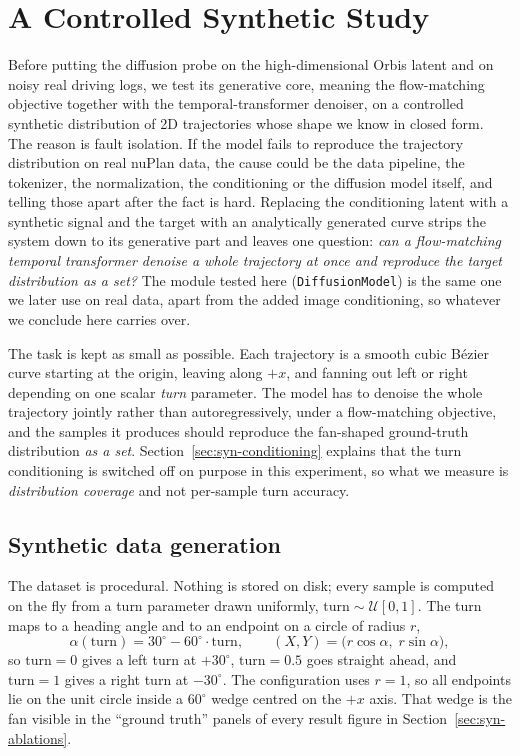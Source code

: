 \section{A Controlled Synthetic Study}
\label{sec:synthetic}

Before putting the diffusion probe on the high-dimensional Orbis latent and on
noisy real driving logs, we test its generative core, meaning the flow-matching
objective together with the temporal-transformer denoiser, on a controlled
synthetic distribution of 2D trajectories whose shape we know in closed form.
The reason is fault isolation. If the model fails to reproduce the trajectory
distribution on real nuPlan data, the cause could be the data pipeline, the
tokenizer, the normalization, the conditioning or the diffusion model itself,
and telling those apart after the fact is hard. Replacing the conditioning
latent with a synthetic signal and the target with an analytically generated
curve strips the system down to its generative part and leaves one question:
\emph{can a flow-matching temporal transformer denoise a whole trajectory at
once and reproduce the target distribution as a set?} The module tested here
(\texttt{DiffusionModel}) is the same one we later use on real data, apart from
the added image conditioning, so whatever we conclude here carries over.

The task is kept as small as possible. Each trajectory is a smooth cubic
B\'ezier curve starting at the origin, leaving along $+x$, and fanning out left
or right depending on one scalar \emph{turn} parameter. The model has to denoise
the whole trajectory jointly rather than autoregressively, under a flow-matching
objective, and the samples it produces should reproduce the fan-shaped
ground-truth distribution \emph{as a set}. Section~\ref{sec:syn-conditioning}
explains that the turn conditioning is switched off on purpose in this
experiment, so what we measure is \emph{distribution coverage} and not
per-sample turn accuracy.

\subsection{Synthetic data generation}
\label{sec:syn-data}

The dataset is procedural. Nothing is stored on disk; every sample is computed
on the fly from a turn parameter drawn uniformly,
$\text{turn}\sim\mathcal{U}[0,1]$. The turn maps to a heading angle and to an
endpoint on a circle of radius $r$,
\begin{equation}
\alpha(\text{turn}) = 30^\circ - 60^\circ\cdot\text{turn},
\qquad
(X, Y) = \big(r\cos\alpha,\; r\sin\alpha\big),
\label{eq:syn-endpoint}
\end{equation}
so $\text{turn}=0$ gives a left turn at $+30^\circ$, $\text{turn}=0.5$ goes
straight ahead, and $\text{turn}=1$ gives a right turn at $-30^\circ$. The
configuration uses $r=1$, so all endpoints lie on the unit circle inside a
$60^\circ$ wedge centred on the $+x$ axis. That wedge is the fan visible in the
``ground truth'' panels of every result figure in
Section~\ref{sec:syn-ablations}.

